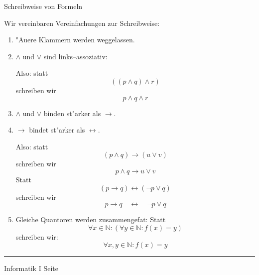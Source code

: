 \begin{slide}{}
\normalsize
\begin{center}
Schreibweise von Formeln
\end{center}
\vspace{0.5cm}

\footnotesize
Wir vereinbaren Vereinfachungen zur Schreibweise:
\begin{enumerate}
\item "Au\3ere Klammern werden weggelassen.
\item $\wedge$ und $\vee$ sind links--assoziativ:

      Also: statt 
      $$        ((p \wedge q) \wedge r)    $$
      schreiben wir 
      $$        p \wedge q \wedge r        $$
\item $\wedge$ und $\vee$ binden st"arker als $\rightarrow$.
\item $\rightarrow$ bindet st"arker als $\leftrightarrow$.

      Also: statt
      $$  (p \wedge q) \rightarrow (u \vee v)  $$
      schreiben wir
      $$  p \wedge q \rightarrow u \vee v  $$
      Statt
      $$  (p \rightarrow q) \leftrightarrow (\neg p \vee q)  $$
      schreiben wir     
      $$  p \rightarrow q \quad \leftrightarrow \quad \neg p \vee q  $$
\item Gleiche Quantoren werden zusammengefa\3t: Statt
      $$  \forall x \in \mathbb{N}: (\forall y \in \mathbb{N}: f(x) = y) $$
      schreiben wir:
      $$  \forall x, y \in \mathbb{N}: f(x) = y $$
\end{enumerate}

\vspace*{\fill}
\tiny \addtocounter{mypage}{1}
\rule{15cm}{1mm}
Informatik I  \hspace*{\fill} Seite 
\end{slide}


